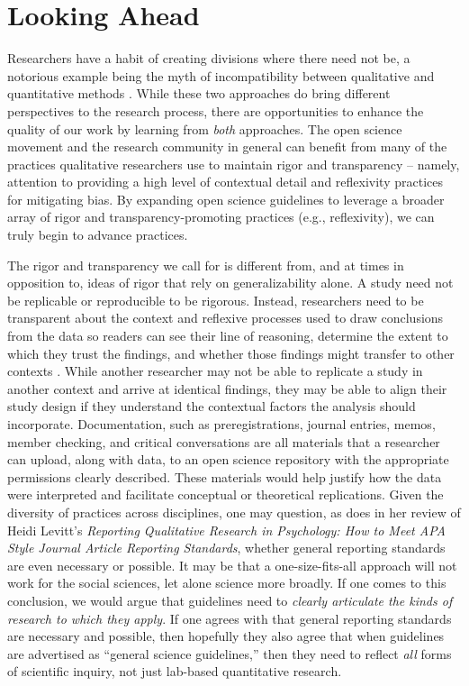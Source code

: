 \documentclass[authordate, meta, issue]{jote-new-article}
\begin{document}
\section{Looking Ahead}



Researchers have a habit of creating divisions where there need not be, a notorious example being the myth of incompatibility between qualitative and quantitative methods \parencites{Ercikan2006}{Malterud2001}. While these two approaches do bring different perspectives to the research process, there are opportunities to enhance the quality of our work by learning from \emph{both }approaches. The open science movement and the research community in general can benefit from many of the practices qualitative researchers use to maintain rigor and transparency – namely, attention to providing a high level of contextual detail and reflexivity practices for mitigating bias. By expanding open science guidelines to leverage a broader array of rigor and transparency-promoting practices (e.g., reflexivity), we can truly begin to advance practices.



The rigor and transparency we call for is different from, and at times in opposition to, ideas of rigor that rely on generalizability alone. A study need not be replicable or reproducible to be rigorous. Instead, researchers need to be transparent about the context and reflexive processes used to draw conclusions from the data so readers can see their line of reasoning, determine the extent to which they trust the findings, and whether those findings might transfer to other contexts \parencites[e.g., trustworthiness;][]{Lincoln1985}. While another researcher may not be able to replicate a study in another context and arrive at identical findings, they may be able to align their study design if they understand the contextual factors the analysis should incorporate. Documentation, such as preregistrations, journal entries, memos, member checking, and critical conversations are all materials that a researcher can upload, along with data, to an open science repository with the appropriate permissions clearly described. These materials would help justify how the data were interpreted and facilitate conceptual or theoretical replications. Given the diversity of practices across disciplines, one may question, as \textcite{Clarke2022} does in her review of Heidi Levitt’s \emph{Reporting Qualitative Research in Psychology: How to Meet APA Style Journal Article Reporting Standards}, whether general reporting standards are even necessary or possible. It may be that a one-size-fits-all approach will not work for the social sciences, let alone science more broadly. If one comes to this conclusion, we would argue that guidelines need to \emph{clearly articulate the kinds of research to which they apply}. If one agrees with \textcite{Levitt2020} that general reporting standards are necessary and possible, then hopefully they also agree that when guidelines are advertised as “general science guidelines,” then they need to reflect \emph{all }forms of scientific inquiry, not just lab-based quantitative research.
\end{document}
